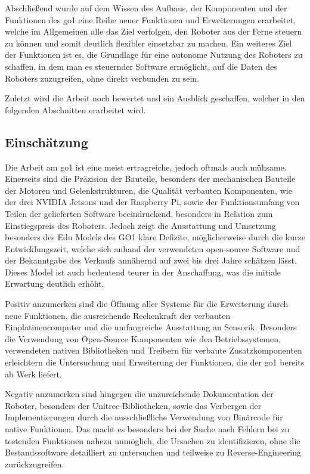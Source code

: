 Abschließend wurde auf dem Wissen des Aufbaus, der Komponenten und der Funktionen des \gls{go1} eine Reihe neuer Funktionen
und Erweiterungen erarbeitet, welche im Allgemeinen alle das Ziel verfolgen, den Roboter aus der Ferne steuern zu können
und somit deutlich flexibler einsetzbar zu machen.
Ein weiteres Ziel der Funktionen ist es, die Grundlage für eine autonome Nutzung des Roboters zu schaffen, in dem man es
steuernder Software ermöglicht, auf die Daten des Roboters zuzugreifen, ohne direkt verbunden zu sein.

Zuletzt wird die Arbeit noch bewertet und ein Ausblick geschaffen, welcher in den folgenden Abschnitten erarbeitet wird.

\subsection{Einschätzung}
\label{subsec:einschatzung}

Die Arbeit am \gls{go1} ist eine meist ertragreiche, jedoch oftmals auch mühsame.
Einerseits sind die Präzision der Bauteile, besonders der mechanischen Bauteile der Motoren und Gelenkstrukturen, die Qualität
verbauten Komponenten, wie der drei NVIDIA Jetsons und der Raspberry Pi, sowie der Funktionsumfang von Teilen der
gelieferten Software beeindruckend, besonders in Relation zum Einstiegspreis des Roboters.
Jedoch zeigt die Ausstattung und Umsetzung besonders des Edu Models des GO1 klare Defizite, möglicherweise durch die kurze
Entwicklungszeit, welche sich anhand der verwendeten open-source Software und der Bekanntgabe des Verkaufs annähernd auf
zwei bis drei Jahre schätzen lässt.
Dieses Model ist auch bedeutend teurer in der Anschaffung, was die initiale Erwartung deutlich erhöht.

Positiv anzumerken sind die Öffnung aller Systeme für die Erweiterung durch neue Funktionen, die ausreichende Rechenkraft
der verbauten Einplatinencomputer und die umfangreiche Ausstattung an Sensorik.
Besonders die Verwendung von Open-Source Komponenten wie den Betriebssystemen, verwendeten nativen Bibliotheken und
Treibern für verbaute Zusatzkomponenten erleichtern die Untersuchung und Erweiterung der Funktionen, die der \gls{go1}
bereits ab Werk liefert.

Negativ anzumerken sind hingegen die unzureichende Dokumentation der Roboter, besonders der Unitree-Bibliotheken, sowie
das Verbergen der Implementierungen durch die ausschließliche Verwendung von Binärcode für native Funktionen.
Das macht es besonders bei der Suche nach Fehlern bei zu testenden Funktionen nahezu unmöglich, die Ursachen zu identifizieren,
ohne die Bestandssoftware detailliert zu untersuchen und teilweise zu Reverse-Engineering zurückzugreifen.

